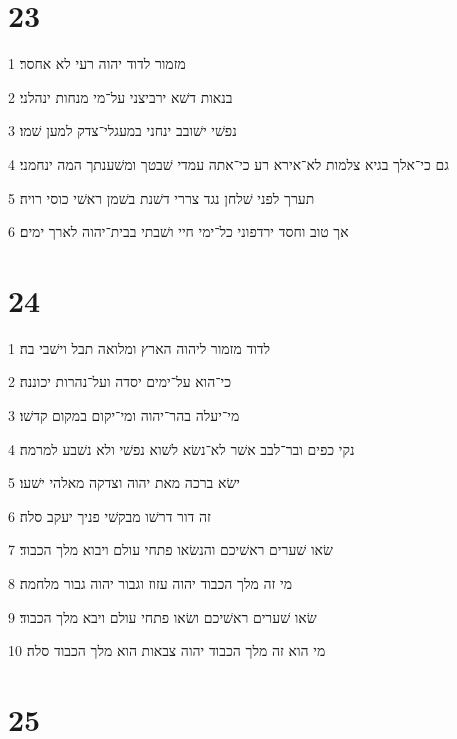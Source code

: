 \chapter{23}

\par 1 מזמור לדוד יהוה רעי לא אחסר׃
\par 2 בנאות דשׁא ירביצני על־מי מנחות ינהלני׃
\par 3 נפשׁי ישׁובב ינחני במעגלי־צדק למען שׁמו׃
\par 4 גם כי־אלך בגיא צלמות לא־אירא רע כי־אתה עמדי שׁבטך ומשׁענתך המה ינחמני׃
\par 5 תערך לפני שׁלחן נגד צררי דשׁנת בשׁמן ראשׁי כוסי רויה׃
\par 6 אך טוב וחסד ירדפוני כל־ימי חיי ושׁבתי בבית־יהוה לארך ימים׃

\chapter{24}

\par 1 לדוד מזמור ליהוה הארץ ומלואה תבל וישׁבי בה׃
\par 2 כי־הוא על־ימים יסדה ועל־נהרות יכוננה׃
\par 3 מי־יעלה בהר־יהוה ומי־יקום במקום קדשׁו׃
\par 4 נקי כפים ובר־לבב אשׁר לא־נשׂא לשׁוא נפשׁי ולא נשׁבע למרמה׃
\par 5 ישׂא ברכה מאת יהוה וצדקה מאלהי ישׁעו׃
\par 6 זה דור דרשׁו מבקשׁי פניך יעקב סלה׃
\par 7 שׂאו שׁערים ראשׁיכם והנשׂאו פתחי עולם ויבוא מלך הכבוד׃
\par 8 מי זה מלך הכבוד יהוה עזוז וגבור יהוה גבור מלחמה׃
\par 9 שׂאו שׁערים ראשׁיכם ושׂאו פתחי עולם ויבא מלך הכבוד׃
\par 10 מי הוא זה מלך הכבוד יהוה צבאות הוא מלך הכבוד סלה׃

\chapter{25}

